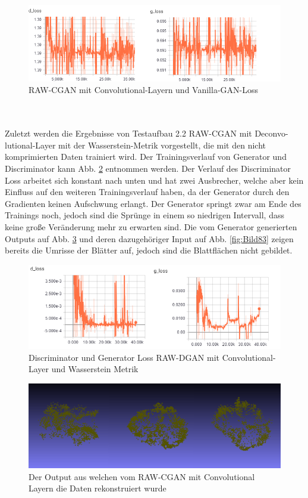 \documentclass{llncs}
\begin{document}
\begin{figure}[htbp] 
	\centering
	\includegraphics[width=1.0\textwidth]{cgan_loss_vanilla.png}
	\caption{RAW-CGAN mit Convolutional-Layern und Vanilla-GAN-Loss}
	\label{fig:Bild79}
\end{figure}
\newpage
~\\\\
Zuletzt werden die Ergebnisse von Testaufbau 2.2 RAW-CGAN mit Deconvo-lutional-Layer mit der Wasserstein-Metrik vorgestellt, die mit den nicht komprimierten Daten trainiert wird.  Der Trainingsverlauf von Generator und Discriminator kann Abb. \ref{fig:Bild1001} entnommen werden.  Der Verlauf des Discriminator Loss arbeitet sich konstant nach unten und hat zwei Ausbrecher, welche aber kein Einfluss auf den weiteren Trainingsverlauf haben, da der Generator durch den Gradienten keinen Aufschwung erlangt. Der Generator springt zwar am Ende des Trainings noch, jedoch sind die Sprünge in einem so niedrigen Intervall, dass keine große Veränderung mehr zu erwarten sind. Die vom Generator generierten Outputs auf Abb. \ref{fig:Bild82} und deren dazugehöriger Input auf Abb. \ref{fig:Bild83} zeigen bereits die Umrisse der Blätter auf, jedoch sind die Blattflächen nicht gebildet. 
\begin{figure}[htbp] 
	\centering
	\includegraphics[width=1.0\textwidth]{cgan_ws_loss.png}
	\caption{Discriminator und Generator Loss RAW-DGAN mit Convolutional-Layer und Wasserstein Metrik}
	\label{fig:Bild1001}
\end{figure}
\begin{figure}[htbp] 
	\centering
	\includegraphics[width=1.0\textwidth]{raw_cgan_ws_fake.png}
	\caption{Der Output aus welchen vom RAW-CGAN mit Convolutional Layern die Daten rekonstruiert wurde}
	\label{fig:Bild82}
\end{figure}
\end{document}
